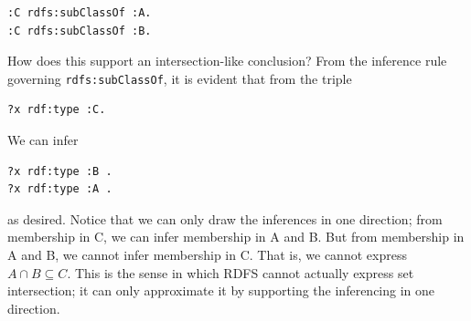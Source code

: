 \begin{lstlisting}
:C rdfs:subClassOf :A.
:C rdfs:subClassOf :B.
\end{lstlisting}

How does this support an intersection-like conclusion? From the
inference rule governing
\texttt{rdfs:subClassOf}, it is evident that from the triple

\begin{lstlisting}
?x rdf:type :C.
\end{lstlisting}


We can infer

\begin{lstlisting}
?x rdf:type :B .
?x rdf:type :A .
\end{lstlisting}

as desired. Notice that we can only draw the inferences in one
direction; from membership in C, we can infer membership in A and B. But
from membership in A and B, we cannot infer membership in C. That is, we
cannot express $A \cap B \subseteq C$. This is the sense in which RDFS cannot
actually express set intersection; it can only approximate it by
supporting the inferencing in one direction.


